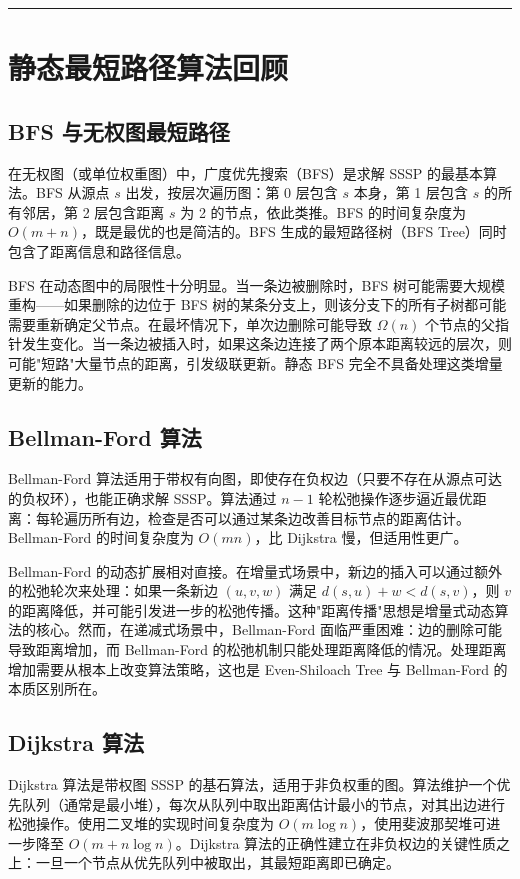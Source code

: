 \documentclass[12pt,a4paper]{ctexart}
\let\oldsection\section
\renewcommand{\section}{\clearpage\oldsection}
\begin{document}
\noindent\rule{\textwidth}{0.4pt}
\section{静态最短路径算法回顾}

\subsection{BFS 与无权图最短路径}

在无权图（或单位权重图）中，广度优先搜索（BFS）是求解 SSSP 的最基本算法。BFS 从源点 $s$ 出发，按层次遍历图：第 0 层包含 $s$ 本身，第 1 层包含 $s$ 的所有邻居，第 2 层包含距离 $s$ 为 2 的节点，依此类推。BFS 的时间复杂度为 $O(m+n)$，既是最优的也是简洁的。BFS 生成的最短路径树（BFS Tree）同时包含了距离信息和路径信息。

BFS 在动态图中的局限性十分明显。当一条边被删除时，BFS 树可能需要大规模重构——如果删除的边位于 BFS 树的某条分支上，则该分支下的所有子树都可能需要重新确定父节点。在最坏情况下，单次边删除可能导致 $\Omega(n)$ 个节点的父指针发生变化。当一条边被插入时，如果这条边连接了两个原本距离较远的层次，则可能"短路"大量节点的距离，引发级联更新。静态 BFS 完全不具备处理这类增量更新的能力。

\subsection{Bellman-Ford 算法}

Bellman-Ford 算法适用于带权有向图，即使存在负权边（只要不存在从源点可达的负权环），也能正确求解 SSSP。算法通过 $n-1$ 轮松弛操作逐步逼近最优距离：每轮遍历所有边，检查是否可以通过某条边改善目标节点的距离估计。Bellman-Ford 的时间复杂度为 $O(mn)$，比 Dijkstra 慢，但适用性更广。

Bellman-Ford 的动态扩展相对直接。在增量式场景中，新边的插入可以通过额外的松弛轮次来处理：如果一条新边 $(u,v,w)$ 满足 $d(s,u)+w<d(s,v)$，则 $v$ 的距离降低，并可能引发进一步的松弛传播。这种"距离传播"思想是增量式动态算法的核心。然而，在递减式场景中，Bellman-Ford 面临严重困难：边的删除可能导致距离增加，而 Bellman-Ford 的松弛机制只能处理距离降低的情况。处理距离增加需要从根本上改变算法策略，这也是 Even-Shiloach Tree 与 Bellman-Ford 的本质区别所在。

\subsection{Dijkstra 算法}

Dijkstra 算法是带权图 SSSP 的基石算法，适用于非负权重的图。算法维护一个优先队列（通常是最小堆），每次从队列中取出距离估计最小的节点，对其出边进行松弛操作。使用二叉堆的实现时间复杂度为 $O(m\log n)$，使用斐波那契堆可进一步降至 $O(m+n\log n)$。Dijkstra 算法的正确性建立在非负权边的关键性质之上：一旦一个节点从优先队列中被取出，其最短距离即已确定。
\end{document}
